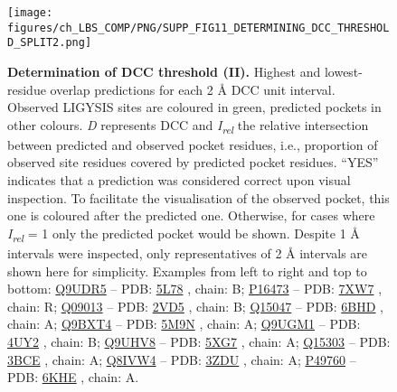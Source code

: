 
\begin{figure}[p]
    \centering
    \texttt{[image: figures/ch\_LBS\_COMP/PNG/SUPP\_FIG11\_DETERMINING\_DCC\_THRESHOLD\_SPLIT2.png]}
    \caption[Determination of DCC threshold (II)]{\textbf{Determination of DCC threshold (II).} Highest and lowest-residue overlap predictions for each 2 \AA{} DCC unit interval. Observed LIGYSIS sites are coloured in green, predicted pockets in other colours. \textit{D} represents DCC and \textit{I\textsubscript{rel}} the relative intersection between predicted and observed pocket residues, i.e., proportion of observed site residues covered by predicted pocket residues. ``YES'' indicates that a prediction was considered correct upon visual inspection. To facilitate the visualisation of the observed pocket, this one is coloured after the predicted one. Otherwise, for cases where \textit{I\textsubscript{rel}} = 1 only the predicted pocket would be shown. Despite 1 \AA{} intervals were inspected, only representatives of 2 \AA{} intervals are shown here for simplicity. Examples from left to right and top to bottom: \href{https://www.uniprot.org/uniprotkb/Q9UDR5/entry}{Q9UDR5} -- PDB: \href{https://www.ebi.ac.uk/pdbe/entry/pdb/5L78}{5L78} \cite{PDB_5L78}, chain: B; \href{https://www.uniprot.org/uniprotkb/P16473/entry}{P16473} -- PDB: \href{https://www.ebi.ac.uk/pdbe/entry/pdb/7XW7}{7XW7} \cite{DUAN_2022_THYROTROPIN}, chain: R; \href{https://www.uniprot.org/uniprotkb/Q09013/entry}{Q09013} -- PDB: \href{https://www.ebi.ac.uk/pdbe/entry/pdb/2VD5}{2VD5} \cite{ELKINS_2009_KINASE}, chain: B; \href{https://www.uniprot.org/uniprotkb/Q15047/entry}{Q15047} -- PDB: \href{https://www.ebi.ac.uk/pdbe/entry/pdb/6BHD}{6BHD} \cite{JURKOWSKA_2017_H3K9}, chain: A; \href{https://www.uniprot.org/uniprotkb/Q9BXT4/entry}{Q9BXT4} -- PDB: \href{https://www.ebi.ac.uk/pdbe/entry/pdb/5M9N}{5M9N} \cite{PDB_5M9N}, chain: A; \href{https://www.uniprot.org/uniprotkb/Q9UGM1/entry}{Q9UGM1} -- PDB: \href{https://www.ebi.ac.uk/pdbe/entry/pdb/4UY2}{4UY2} \cite{ZOURIDAKIS_2014_NICOTINIC}, chain: B; \href{https://www.uniprot.org/uniprotkb/Q9UHV8/entry}{Q9UHV8} -- PDB: \href{https://www.ebi.ac.uk/pdbe/entry/pdb/5XG7}{5XG7} \cite{SU_2018_GALECTIN}, chain: A; \href{https://www.uniprot.org/uniprotkb/Q15303/entry}{Q15303} -- PDB: \href{https://www.ebi.ac.uk/pdbe/entry/pdb/3BCE}{3BCE} \cite{QIU_2008_HER4}, chain: A; \href{https://www.uniprot.org/uniprotkb/Q8IVW4/entry}{Q8IVW4} -- PDB: \href{https://www.ebi.ac.uk/pdbe/entry/pdb/3ZDU}{3ZDU} \cite{CANNING_2018_CDKL}, chain: A; \href{https://www.uniprot.org/uniprotkb/P49760/entry}{P49760} -- PDB: \href{https://www.ebi.ac.uk/pdbe/entry/pdb/6KHE}{6KHE} \cite{LEE_2019_CDC2}, chain: A.}
    \label{fig:DCC_determination2}
\end{figure}


